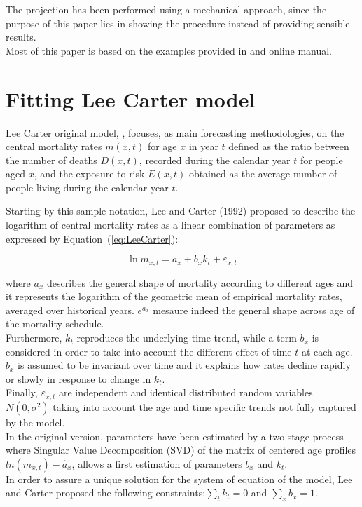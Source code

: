 \documentclass[nojss]{jss}
\begin{document}
The projection has been performed using a mechanical approach, since the purpose of this paper lies in showing the procedure instead of providing sensible results.\\
Most of this paper is based on the examples provided in \cite{rmetrics1} and \cite{charpentierDutang} online manual.

\section{Fitting Lee Carter model}

Lee Carter original model, \cite{Lee1992}, focuses, as main forecasting methodologies, on the central mortality rates $m(x,t)$ for age $x$ in year $t$ defined as the ratio between the number of deaths $D(x,t)$, recorded during the calendar year $t$ for people aged $x$, and the exposure to risk $E(x,t)$ obtained as the average number of people living during the calendar year $t$.

Starting by this sample notation, Lee and Carter (1992) proposed to describe the logarithm of central mortality rates as a linear combination of parameters as expressed by Equation~(\ref{eq:LeeCarter}):

\begin{equation}
\ln m_{x,t} = a_{x} + b_{x} k_{t} + \varepsilon_{x,t}
\label{eq:LeeCarter}
\end{equation}

where $a_{x}$ describes the general shape of mortality according to different ages and it represents the logarithm of the geometric mean of empirical mortality rates, averaged over historical years. $e^{a_{x}}$ mesaure indeed the general shape across age of the mortality schedule. \\
Furthermore, $k_{t}$ reproduces the underlying time trend, while a term $b_{x}$ is considered in order to take into account the different effect of time $t$ at each age. 
$b_{x}$ is assumed to be invariant over time and it explains how rates decline rapidly or slowly in response to change in $k_{t}$. \\  
Finally, $\varepsilon_{x,t}$ are independent and identical distributed random variables $N(0,\sigma^{2})$ taking into account the age and time specific trends not fully captured by the model. \\

In the original version, parameters have been estimated by a two-stage process where Singular Value Decomposition (SVD) of the matrix of centered age profiles $ln(m_{x,t})-\hat{a}_{x}$, allows a first estimation of parameters $b_{x}$ and $k_{t}$. \\
In order to assure a unique solution for the system of equation of the model, Lee and Carter proposed the following constraints:$\sum_{t}k_{t}=0$ and $\sum_{x}b_{x}=1$. \\
\end{document}
